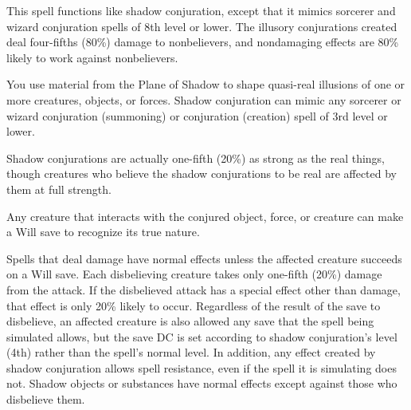 \begin{multicols}{2}
\begin{small}

\noindent This spell functions like shadow conjuration, except that it mimics sorcerer and wizard conjuration spells of 8th level or lower. The illusory conjurations created deal four-fifths (80\%) damage to nonbelievers, and nondamaging effects are 80\% likely to work against nonbelievers.

\noindent You use material from the Plane of Shadow to shape quasi-real illusions of one or more creatures, objects, or forces. Shadow conjuration can mimic any sorcerer or wizard conjuration (summoning) or conjuration (creation) spell of 3rd level or lower.

\smallskip\noindent Shadow conjurations are actually one-fifth (20\%) as strong as the real things, though creatures who believe the shadow conjurations to be real are affected by them at full strength.

\smallskip\noindent Any creature that interacts with the conjured object, force, or creature can make a Will save to recognize its true nature.

\smallskip\noindent Spells that deal damage have normal effects unless the affected creature succeeds on a Will save. Each disbelieving creature takes only one-fifth (20\%) damage from the attack. If the disbelieved attack has a special effect other than damage, that effect is only 20\% likely to occur. Regardless of the result of the save to disbelieve, an affected creature is also allowed any save that the spell being simulated allows, but the save DC is set according to shadow conjuration's level (4th) rather than the spell's normal level. In addition, any effect created by shadow conjuration allows spell resistance, even if the spell it is simulating does not. Shadow objects or substances have normal effects except against those who disbelieve them.


\end{small}
\end{multicols}
